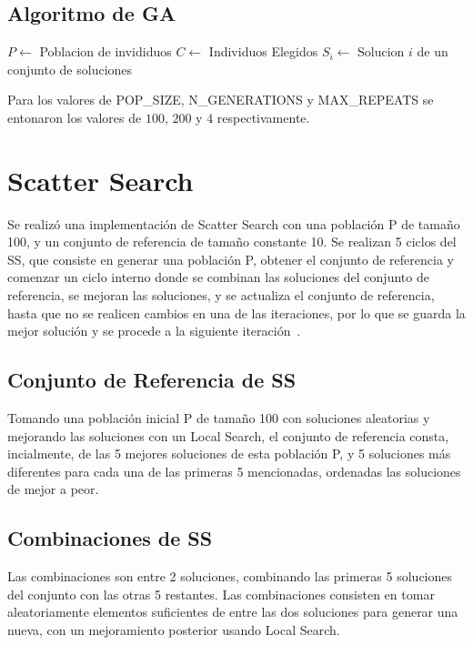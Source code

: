\documentclass{ci5652}
\begin{document}
\subsection{Algoritmo de GA}
\begin{algorithm}[h!]
\DontPrintSemicolon
$P \leftarrow$ Poblacion de invididuos\;
$C \leftarrow$ Individuos Elegidos\;
$S_i \leftarrow$ Solucion $i$ de un conjunto de soluciones\;
\end{algorithm}

Para los valores de POP\_SIZE, N\_GENERATIONS y MAX\_REPEATS se entonaron los valores de $100$, $200$ y $4$ respectivamente.

\section{Scatter Search}
Se realizó una implementación de Scatter Search con una población P de tamaño 100, y un conjunto de referencia de tamaño constante 10. Se realizan 5 ciclos del SS, que consiste en generar una población P, obtener el conjunto de referencia y comenzar un ciclo interno donde se combinan las soluciones del conjunto de referencia, se mejoran las soluciones, y se actualiza el conjunto de referencia, hasta que no se realicen cambios en una de las iteraciones, por lo que se guarda la mejor solución y se procede a la siguiente iteración~\cite{ssmarti}.

\subsection{Conjunto de Referencia de SS}
Tomando una población inicial P de tamaño 100 con soluciones aleatorias y mejorando las soluciones con un Local Search, el conjunto de referencia consta, incialmente, de las 5 mejores soluciones de esta población P, y 5 soluciones más diferentes para cada una de las primeras 5 mencionadas, ordenadas las soluciones de mejor a peor.

\subsection{Combinaciones de SS}
Las combinaciones son entre 2 soluciones, combinando las primeras 5 soluciones del conjunto con las otras 5 restantes. Las combinaciones consisten en tomar aleatoriamente elementos suficientes de entre las dos soluciones para generar una nueva, con un mejoramiento posterior usando Local Search.
\end{document}
